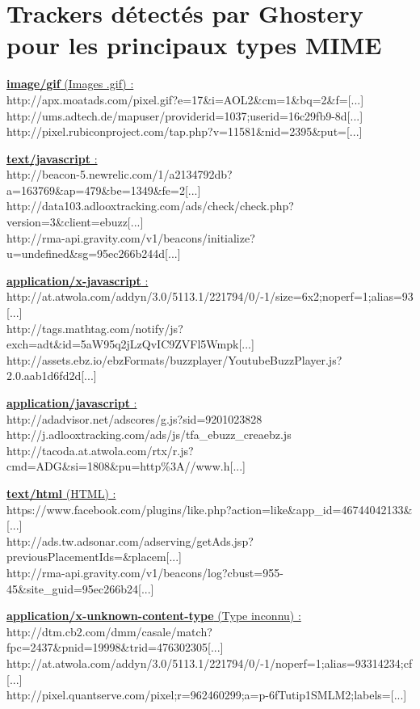 \chapter{Trackers détectés par Ghostery pour les principaux types MIME}
\label{ghostery_mimetypes}

\underline{\textbf{image/gif} (Images .gif) :}\\
 http://apx.moatads.com/pixel.gif?e=17\&i=AOL2\&cm=1\&bq=2\&f=[...]\\
 http://ums.adtech.de/mapuser/providerid=1037;userid=16c29fb9-8d[...]\\
 http://pixel.rubiconproject.com/tap.php?v=11581\&nid=2395\&put=[...]

\underline{\textbf{text/javascript} :}\\
 http://beacon-5.newrelic.com/1/a2134792db?a=163769\&ap=479\&be=1349\&fe=2[...]\\
 http://data103.adlooxtracking.com/ads/check/check.php?version=3\&client=ebuzz[...]\\
 http://rma-api.gravity.com/v1/beacons/initialize?u=undefined\&sg=95ec266b244d[...]

\underline{\textbf{application/x-javascript} :}\\
 http://at.atwola.com/addyn/3.0/5113.1/221794/0/-1/size=6x2;noperf=1;alias=93[...]\\
 http://tags.mathtag.com/notify/js?exch=adt\&id=5aW95q2jLzQvIC9ZVFl5Wmpk[...]\\
 http://assets.ebz.io/ebzFormats/buzzplayer/YoutubeBuzzPlayer.js?2.0.aab1d6fd2d[...]

\underline{\textbf{application/javascript} :}\\
 http://adadvisor.net/adscores/g.js?sid=9201023828\\
 http://j.adlooxtracking.com/ads/js/tfa\_ebuzz\_creaebz.js\\
 http://tacoda.at.atwola.com/rtx/r.js?cmd=ADG\&si=1808\&pu=http\%3A//www.h[...]

\underline{\textbf{text/html} (HTML) :}\\
 https://www.facebook.com/plugins/like.php?action=like\&app\_id=46744042133\&[...]\\
 http://ads.tw.adsonar.com/adserving/getAds.jsp?previousPlacementIds=\&placem[...]\\
 http://rma-api.gravity.com/v1/beacons/log?cbust=955-45\&site\_guid=95ec266b24[...]

\underline{\textbf{application/x-unknown-content-type} (Type inconnu) :}\\
 http://dtm.cb2.com/dmm/casale/match?fpc=2437\&pnid=19998\&trid=476302305[...]\\
 http://at.atwola.com/addyn/3.0/5113.1/221794/0/-1/noperf=1;alias=93314234;cf[...]\\
 http://pixel.quantserve.com/pixel;r=962460299;a=p-6fTutip1SMLM2;labels=[...]
